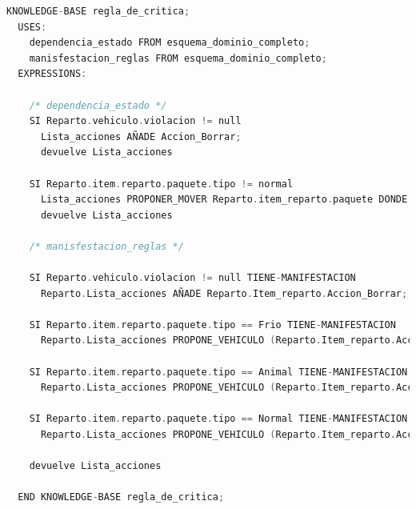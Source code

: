 \begin{lstlisting}[language=C,caption=\textbf{Regla\_de\_critica}]
  KNOWLEDGE-BASE regla_de_critica;
  USES:
    dependencia_estado FROM esquema_dominio_completo; 
    manisfestacion_reglas FROM esquema_dominio_completo;
  EXPRESSIONS:

    /* dependencia_estado */
    SI Reparto.vehiculo.violacion != null
      Lista_acciones AÑADE Accion_Borrar;
      devuelve Lista_acciones

    SI Reparto.item.reparto.paquete.tipo != normal
      Lista_acciones PROPONER_MOVER Reparto.item_reparto.paquete DONDE (paquete.tipo == vehiculo.tipo);
      devuelve Lista_acciones

    /* manisfestacion_reglas */

    SI Reparto.vehiculo.violacion != null TIENE-MANIFESTACION
      Reparto.Lista_acciones AÑADE Reparto.Item_reparto.Accion_Borrar;

    SI Reparto.item.reparto.paquete.tipo == Frio TIENE-MANIFESTACION
      Reparto.Lista_acciones PROPONE_VEHICULO (Reparto.Item_reparto.Accion_Añadir, frio)

    SI Reparto.item.reparto.paquete.tipo == Animal TIENE-MANIFESTACION
      Reparto.Lista_acciones PROPONE_VEHICULO (Reparto.Item_reparto.Accion_Añadir, animal)

    SI Reparto.item.reparto.paquete.tipo == Normal TIENE-MANIFESTACION
      Reparto.Lista_acciones PROPONE_VEHICULO (Reparto.Item_reparto.Accion_Añadir, normal)

    devuelve Lista_acciones
      
  END KNOWLEDGE-BASE regla_de_critica;
\end{lstlisting}